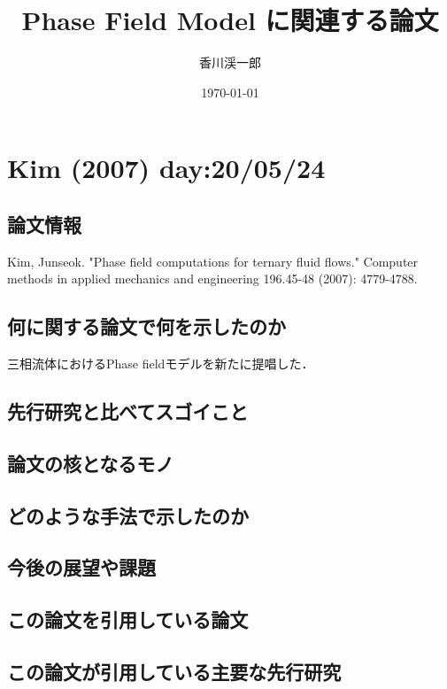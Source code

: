 \documentclass[openary, a4paper, oneside]{jsarticle}
\begin{document}
\title{Phase Field Model に関連する論文}
\author{香川渓一郎}
\date{\today}
\maketitle
\setcounter{tocdepth}{1}
\tableofcontents

\section{Kim (2007) \cite{Kim2007} day:20/05/24}
    \subsection{論文情報}
    Kim, Junseok. "Phase field computations for ternary fluid flows." Computer methods in applied mechanics and engineering 196.45-48 (2007): 4779-4788.
    \subsection{何に関する論文で何を示したのか}
    三相流体におけるPhase fieldモデルを新たに提唱した．
    \subsection{先行研究と比べてスゴイこと}
    \subsection{論文の核となるモノ}
    \subsection{どのような手法で示したのか}
    \subsection{今後の展望や課題}
    \subsection{この論文を引用している論文}
    \subsection{この論文が引用している主要な先行研究}



\end{document}
